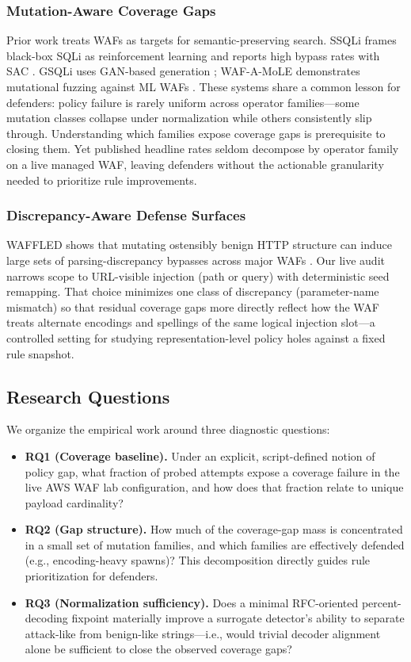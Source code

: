 \subsubsection{Mutation-Aware Coverage Gaps}
Prior work treats WAFs as targets for semantic-preserving search. SSQLi frames black-box SQLi as reinforcement learning and reports high bypass rates with SAC \cite{guan2023ssqli}. GSQLi uses GAN-based generation \cite{khan2024gsqli}; WAF-A-MoLE demonstrates mutational fuzzing against ML WAFs \cite{demetrio2020wafamole}. These systems share a common lesson for defenders: policy failure is rarely uniform across operator families---some mutation classes collapse under normalization while others consistently slip through. Understanding which families expose coverage gaps is prerequisite to closing them. Yet published headline rates seldom decompose by operator family on a live managed WAF, leaving defenders without the actionable granularity needed to prioritize rule improvements.

\subsubsection{Discrepancy-Aware Defense Surfaces}
WAFFLED shows that mutating ostensibly benign HTTP structure can induce large sets of parsing-discrepancy bypasses across major WAFs \cite{akhavani2025waffled}. Our live audit narrows scope to URL-visible injection (path or query) with deterministic seed remapping. That choice minimizes one class of discrepancy (parameter-name mismatch) so that residual coverage gaps more directly reflect how the WAF treats alternate encodings and spellings of the same logical injection slot---a controlled setting for studying representation-level policy holes against a fixed rule snapshot.

\subsection{Research Questions}
We organize the empirical work around three diagnostic questions:
\begin{itemize}
  \item \textbf{RQ1 (Coverage baseline).} Under an explicit, script-defined notion of policy gap, what fraction of probed attempts expose a coverage failure in the live AWS WAF lab configuration, and how does that fraction relate to unique payload cardinality?
  \item \textbf{RQ2 (Gap structure).} How much of the coverage-gap mass is concentrated in a small set of mutation families, and which families are effectively defended (e.g., encoding-heavy spawns)? This decomposition directly guides rule prioritization for defenders.
  \item \textbf{RQ3 (Normalization sufficiency).} Does a minimal RFC-oriented percent-decoding fixpoint materially improve a surrogate detector's ability to separate attack-like from benign-like strings---i.e., would trivial decoder alignment alone be sufficient to close the observed coverage gaps?
\end{itemize}

